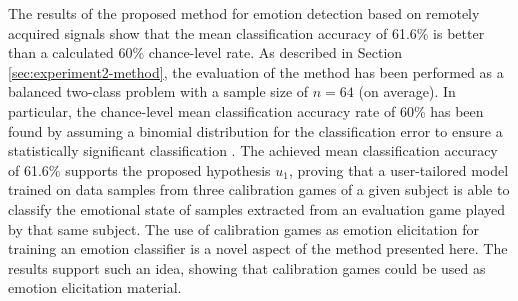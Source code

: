 The results of the proposed method for emotion detection based on remotely acquired signals show that the mean classification accuracy of 61.6\% is better than a calculated 60\% chance-level rate. As described in Section \ref{sec:experiment2-method}, the evaluation of the method has been performed as a balanced two-class problem with a sample size of $n=64$ (on average). In particular, the chance-level mean classification accuracy rate of 60\% has been found by assuming a binomial distribution for the classification error to ensure a statistically significant classification \parencite{combrisson2015exceeding}. The achieved mean classification accuracy of 61.6\% supports the proposed hypothesis $u_1$, proving that a user-tailored model trained on data samples from three calibration games of a given subject is able to classify the emotional state of samples extracted from an evaluation game played by that same subject. The use of calibration games as emotion elicitation for training an emotion classifier is a novel aspect of the method presented here. The results support such an idea, showing that calibration games could be used as emotion elicitation material.

